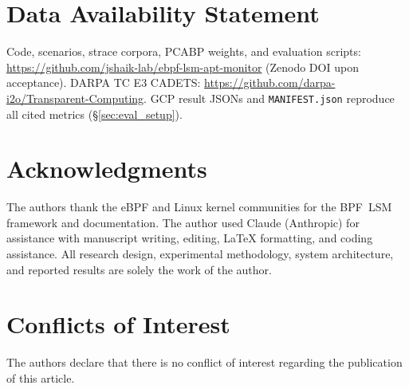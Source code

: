 \documentclass[journal]{IEEEtran}
\begin{document}
\section*{Data Availability Statement}
Code, scenarios, strace corpora, PCABP weights, and evaluation scripts:
\url{https://github.com/jshaik-lab/ebpf-lsm-apt-monitor}
(Zenodo DOI upon acceptance).  DARPA TC E3 CADETS:
\url{https://github.com/darpa-i2o/Transparent-Computing}.
GCP result JSONs and \texttt{MANIFEST.json} reproduce all cited metrics
(\S\ref{sec:eval_setup}).

\section*{Acknowledgments}
The authors thank the eBPF and Linux kernel communities for the BPF~LSM
framework and documentation.
The author used Claude (Anthropic) for assistance with manuscript writing, editing, \LaTeX{} formatting, and coding assistance.
All research design, experimental methodology, system architecture, and reported results are solely the work of the author.

\section*{Conflicts of Interest}
The authors declare that there is no conflict of interest regarding the
publication of this article.

\FloatBarrier
\let\oldbibliography\thebibliography
\renewcommand{\thebibliography}[1]{%
  \oldbibliography{#1}%
  \setlength{\itemsep}{0pt plus 0.3pt}%
  \setlength{\parsep}{0pt}%
}

\balance

\end{document}
